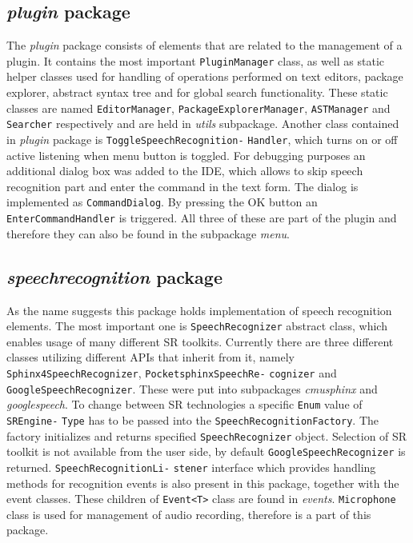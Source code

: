 \subsection{\textit{plugin} package}
The \textit{plugin} package consists of elements that are related to the management of a plugin. It contains the most important \texttt{PluginManager} class, as well as static helper classes used for handling of operations performed on text editors, package explorer, abstract syntax tree and for global search functionality. These static classes are named \texttt{EditorManager}, \texttt{PackageExplorerManager}, \texttt{ASTManager} and \texttt{Searcher} respectively and are held in \textit{utils} subpackage. Another class contained in \textit{plugin} package is \texttt{ToggleSpeechRecognition-} \texttt{Handler}, which turns on or off active listening when menu button is toggled. For debugging purposes an additional dialog box was added to the IDE, which allows to skip speech recognition part and enter the command in the text form. The dialog is implemented as \texttt{CommandDialog}. By pressing the OK button an \texttt{EnterCommandHandler} is triggered. All three of these are part of the plugin and therefore they can also be found in the subpackage \textit{menu}.

\subsection{\textit{speechrecognition} package}
As the name suggests this package holds implementation of speech recognition elements. The most important one is \texttt{SpeechRecognizer} abstract class, which enables usage of many different SR toolkits. Currently there are three different classes utilizing different APIs that inherit from it, namely \texttt{Sphinx4SpeechRecognizer}, \texttt{PocketsphinxSpeechRe-} \texttt{cognizer} and \texttt{GoogleSpeechRecognizer}. These were put into subpackages \textit{cmusphinx} and \textit{googlespeech}. To change between SR technologies a specific \texttt{Enum} value of \texttt{SREngine-} \texttt{Type} has to be passed into the \texttt{SpeechRecognitionFactory}. The factory initializes and returns specified \texttt{SpeechRecognizer} object. Selection of SR toolkit is not available from the user side, by default \texttt{GoogleSpeechRecognizer} is returned.  \texttt{SpeechRecognitionLi-} \texttt{stener} interface which provides handling methods for recognition events is also present in this package, together with the event classes. These children of \texttt{Event<T>} class are found in \textit{events}. \texttt{Microphone} class is used for management of audio recording, therefore is a part of this package.

